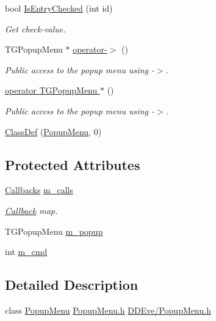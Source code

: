 \begin{DoxyCompactItemize}
bool \hyperlink{class_d_d4hep_1_1_popup_menu_ae1fcd8933b7dbff53327cfb1f13d00d4}{Is\+Entry\+Checked} (int id)
\begin{DoxyCompactList}\small\item\em Get check-\/value. \end{DoxyCompactList}\item 
T\+G\+Popup\+Menu $\ast$ \hyperlink{class_d_d4hep_1_1_popup_menu_a0241a71021c9288a1f6207a25d6a82e6}{operator-\/$>$} ()
\begin{DoxyCompactList}\small\item\em Public access to the popup menu using \textquotesingle{}-\/$>$\textquotesingle{}. \end{DoxyCompactList}\item 
\hyperlink{class_d_d4hep_1_1_popup_menu_a979ec84020ea83105d4bfc6c5c5b8fe8}{operator T\+G\+Popup\+Menu $\ast$} ()
\begin{DoxyCompactList}\small\item\em Public access to the popup menu using \textquotesingle{}-\/$>$\textquotesingle{}. \end{DoxyCompactList}\item 
\hyperlink{class_d_d4hep_1_1_popup_menu_a8ffb8033e698baa49a05c79c66e0f5c2}{Class\+Def} (\hyperlink{class_d_d4hep_1_1_popup_menu}{Popup\+Menu}, 0)
\end{DoxyCompactItemize}
\subsection*{Protected Attributes}
\begin{DoxyCompactItemize}
\item 
\hyperlink{class_d_d4hep_1_1_popup_menu_aea53283ce44fa4935d8b7a3751ad1b5b}{Callbacks} \hyperlink{class_d_d4hep_1_1_popup_menu_a19b33a5d34c5fca703a9e5f6946f5e10}{m\+\_\+calls}
\begin{DoxyCompactList}\small\item\em \hyperlink{class_d_d4hep_1_1_callback}{Callback} map. \end{DoxyCompactList}\item 
T\+G\+Popup\+Menu \hyperlink{class_d_d4hep_1_1_popup_menu_a97937d940ef3c3d519f0ed1a5b8638ee}{m\+\_\+popup}
\item 
int \hyperlink{class_d_d4hep_1_1_popup_menu_ad631ad62359a2754913630d248967f71}{m\+\_\+cmd}
\end{DoxyCompactItemize}


\subsection{Detailed Description}
class \hyperlink{class_d_d4hep_1_1_popup_menu}{Popup\+Menu} \hyperlink{_popup_menu_8h}{Popup\+Menu.\+h} \hyperlink{_popup_menu_8h}{D\+D\+Eve/\+Popup\+Menu.\+h} 

